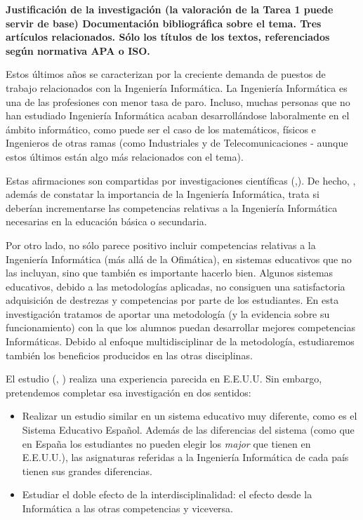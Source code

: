 \documentclass[palatino,nochap]{apuntesURJC}
\def\citeapos#1{\citetitle{#1} (\citeauthor{#1}, \citeyear{#1}) \cite{#1}}
\begin{document}
\textbf{Justificación de la investigación (la valoración de la Tarea 1 puede servir de base)
%
Documentación bibliográfica sobre el tema.
%
Tres artículos relacionados. 
%
Sólo los títulos de los textos, referenciados según normativa APA o ISO.}


Estos últimos años se caracterizan por la creciente demanda de puestos de trabajo relacionados con la Ingeniería Informática.
%
La Ingeniería Informática es una de las profesiones con menor tasa de paro. 
%
Incluso, muchas personas que no han estudiado Ingeniería Informática acaban desarrollándose laboralmente en el ámbito informático, como puede ser el caso de los matemáticos, físicos e Ingenieros de otras ramas (como Industriales y de Telecomunicaciones - aunque estos últimos están algo más relacionados con el tema).

Estas afirmaciones son compartidas por investigaciones científicas (\cite{CSIsImportant},\cite{CSArguing}). 
%
De hecho, \cite{CSArguing}, además de constatar la importancia de la Ingeniería Informática, trata si deberían incrementarse las competencias relativas a la Ingeniería Informática necesarias en la educación básica o secundaria.

Por otro lado, no sólo parece positivo incluir competencias relativas a la Ingeniería Informática (más allá de la Ofimática), en sistemas educativos que no las incluyan, sino que también es importante hacerlo bien.
%
Algunos sistemas educativos, debido a las metodologías aplicadas, no consiguen una satisfactoria adquisición de destrezas y competencias por parte de los estudiantes.
%
En esta investigación tratamos de aportar una metodología (y la evidencia sobre su funcionamiento) con la que los alumnos puedan desarrollar mejores competencias Informáticas. 
%
Debido al enfoque multidisciplinar de la metodología, estudiaremos también los beneficios producidos en las otras disciplinas.

El estudio \cite{Interdiscipline} \citeapos{Interdiscipline} realiza una experiencia parecida en E.E.U.U. Sin embargo, pretendemos completar esa investigación en dos sentidos: 
\begin{itemize}
	\item Realizar un estudio similar en un sistema educativo muy diferente, como es el Sistema Educativo Español. 
	Además de las diferencias del sistema (como que en España los estudiantes no pueden elegir los \textit{major} que tienen en E.E.U.U.), las asignaturas referidas a la Ingeniería Informática de cada país tienen sus grandes diferencias.
	\item Estudiar el doble efecto de la interdisciplinalidad: el efecto desde la Informática a las otras competencias y viceversa.
\end{itemize}
\end{document}
